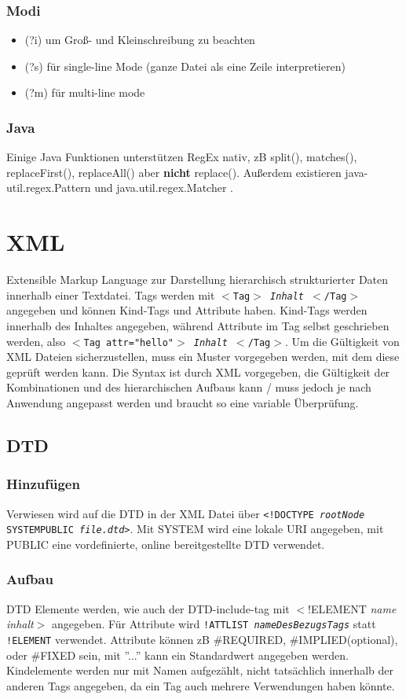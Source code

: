 \documentclass[12pt,a4]{article}
\begin{document}
\subsubsection{Modi}
\begin{itemize}
	\item (?i) um Groß- und Kleinschreibung zu beachten
	\item (?s) für single-line Mode (ganze Datei als eine Zeile interpretieren)
	\item (?m) für multi-line mode
\end{itemize}
\subsubsection{Java}
Einige Java Funktionen unterstützen RegEx nativ, zB split(), matches(), replaceFirst(), replaceAll() aber \textbf{nicht} replace(). Außerdem existieren java-util.regex.Pattern und java.util.regex.Matcher .

\section{XML}
Extensible Markup Language zur Darstellung hierarchisch strukturierter Daten innerhalb einer Textdatei. \newline Tags werden mit \texttt{\(<\)Tag\(>\) \textit{Inhalt} \(<\)/Tag\(>\)} angegeben und können Kind-Tags und Attribute haben. Kind-Tags werden innerhalb des Inhaltes angegeben, während Attribute im Tag selbst geschrieben werden, also \newline \texttt{\(<\)Tag attr="hello"\(>\) \textit{Inhalt} \(<\)/Tag\(>\)}. Um die Gültigkeit von XML Dateien sicherzustellen, muss ein Muster vorgegeben werden, mit dem diese geprüft werden kann. Die Syntax ist durch XML vorgegeben, die Gültigkeit der Kombinationen und des hierarchischen Aufbaus kann / muss jedoch je nach Anwendung angepasst werden und braucht so eine variable Überprüfung.
\subsection{DTD}
\subsubsection{Hinzufügen}
Verwiesen wird auf die DTD in der XML Datei über \texttt{<!DOCTYPE \textit{rootNode} SYSTEM\textbar PUBLIC \textit{file.dtd}>}. Mit SYSTEM wird eine lokale URI angegeben, mit PUBLIC eine vordefinierte, online bereitgestellte DTD verwendet.
\subsubsection{Aufbau}
DTD Elemente werden, wie auch der DTD-include-tag mit \(<\)!ELEMENT \textit{name} \textit{inhalt}\(>\) angegeben. Für Attribute wird \texttt{!ATTLIST  \textit{nameDesBezugsTags}} statt \texttt{!ELEMENT}  verwendet. Attribute können zB \#REQUIRED, \#IMPLIED(optional), oder \#FIXED sein, mit ''...'' kann ein Standardwert angegeben werden. Kindelemente werden nur mit Namen aufgezählt, nicht tatsächlich innerhalb der anderen Tags angegeben, da ein Tag auch mehrere Verwendungen haben könnte.
\end{document}
